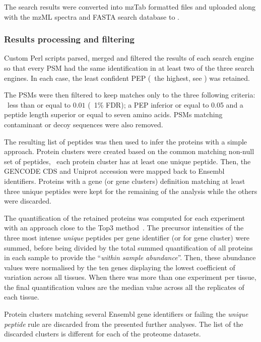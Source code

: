 The search results were converted into mzTab formatted files and uploaded along
with the mzML spectra and FASTA search database to .

\subsubsection{Results processing and filtering}\label{subsub:resultsFiltering}

Custom Perl scripts parsed, merged and filtered the results of each search engine
so that every \gls{PSM} had the same identification in at least two of the three
search engines.
In each case, the least confident \gls{PEP} (\ie\ the highest, see ) was retained.

The \glspl{PSM} were then filtered to keep matches only to the three following
criteria:
\qval\ less than or equal to $0.01$ (\ie\ 1\% \gls{FDR});
a \gls{PEP} inferior or equal to 0.05 and
a peptide length superior or equal to seven amino acids.
\glspl{PSM} matching contaminant or decoy sequences were also removed.

The resulting list of peptides was then used to infer the proteins with
a simple approach.
Protein clusters were created based on the common matching non-null set of peptides,
\ie\ each protein cluster has at least one unique peptide.
Then, the \gls{GENCODE} \gls{CDS} and \gls{Uniprot} accession were mapped back to
\gls{Ensembl} identifiers.
Proteins with a gene (or gene clusters) definition
matching at least three unique peptides
were kept for the remaining of the analysis
while the others were discarded.

The quantification of the retained proteins was computed for each experiment
with an approach close to the Top3 method~.
The precursor intensities of the three most intense \emph{unique} peptides
per gene identifier (or for gene cluster) were summed,
before being divided by the total summed quantification of all proteins
in each sample to provide the \enquote{\emph{within sample abundance}}.
Then, these abundance values were normalised by the ten genes displaying
the  lowest  coefficient  of  variation  across  all  tissues.
When there was more than one experiment per tissue,
the final quantification values are
the median value across all the replicates of each tissue.

Protein clusters matching several \gls{Ensembl} gene identifiers or
failing the \emph{unique peptide} rule are discarded
from the presented further analyses.
The list of the discarded clusters is different for each of the
proteome datasets.


